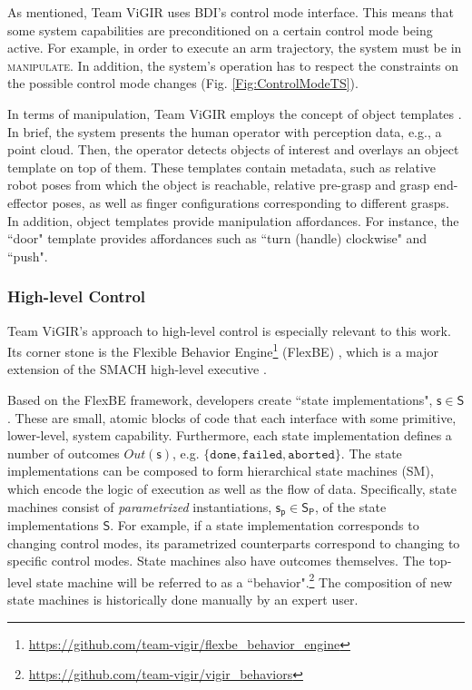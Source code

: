 As mentioned, Team ViGIR uses BDI's control mode interface.
This means that some system capabilities are preconditioned on a certain control mode being active.
For example, in order to execute an arm trajectory, the system must be in \textsc{manipulate}.
In addition, the system's operation has to respect the constraints on the possible control mode changes (Fig. \ref{Fig:ControlModeTS}).

In terms of manipulation, Team ViGIR employs the concept of object templates \cite{Alberto2014Humanoids}.
In brief, the system presents the human operator with perception data, e.g., a point cloud.
Then, the operator detects objects of interest and overlays an object template on top of them.
These templates contain metadata, such as relative robot poses from which the object is reachable, relative pre-grasp and grasp end-effector poses, as well as finger configurations corresponding to different grasps.
In addition, object templates provide manipulation affordances.
For instance, the ``door" template provides affordances such as ``turn (handle) clockwise" and ``push".

\subsubsection*{High-level Control}\label{S:FlexBE}
Team ViGIR's approach to high-level control is especially relevant to this work.
Its corner stone is the Flexible Behavior Engine\footnote{\scriptsize{\url{https://github.com/team-vigir/flexbe_behavior_engine}}} (FlexBE) \cite{Philipp2013Bsc, Philipp2015Msc}, which is a major extension of the SMACH high-level executive \cite{SMACH2010RAM}.

Based on the FlexBE framework, developers create ``state implementations", $\mathsf{s} \in \mathsf{S}$. %
These are small, atomic blocks of code that each interface with some primitive, lower-level, system capability.
Furthermore, each state implementation defines a number of outcomes $Out(\mathsf{s})$, e.g. $\{ \mathtt{done}, \mathtt{failed}, \mathtt{aborted} \}$.
The state implementations can be composed to form hierarchical state machines (SM), which encode the logic of execution as well as the flow of data.
Specifically, state machines consist of \emph{parametrized} instantiations, $\mathsf{s_p} \in \mathsf{S_P}$, of the state implementations $\mathsf{S}$.
For example, if a state implementation corresponds to changing control modes, its parametrized counterparts correspond to changing to specific control modes.
State machines also have outcomes themselves.
The top-level state machine will be referred to as a ``behavior".\footnote{\scriptsize{\url{https://github.com/team-vigir/vigir_behaviors}}}
The composition of new state machines is historically done manually by an expert user.

